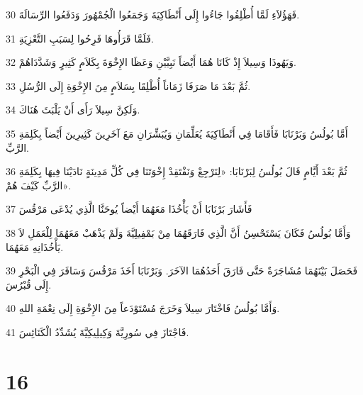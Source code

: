 \par 30 فَهَؤُلاَءِ لَمَّا أُطْلِقُوا جَاءُوا إِلَى أَنْطَاكِيَةَ وَجَمَعُوا الْجُمْهُورَ وَدَفَعُوا الرِّسَالَةَ.
\par 31 فَلَمَّا قَرَأُوهَا فَرِحُوا لِسَبَبِ التَّعْزِيَةِ.
\par 32 وَيَهُوذَا وَسِيلاَ إِذْ كَانَا هُمَا أَيْضاً نَبِيَّيْنِ وَعَظَا الإِخْوَةَ بِكَلاَمٍ كَثِيرٍ وَشَدَّدَاهُمْ.
\par 33 ثُمَّ بَعْدَ مَا صَرَفَا زَمَاناً أُطْلِقَا بِسَلاَمٍ مِنَ الإِخْوَةِ إِلَى الرُّسُلِ.
\par 34 وَلَكِنَّ سِيلاَ رَأَى أَنْ يَلْبَثَ هُنَاكَ.
\par 35 أَمَّا بُولُسُ وَبَرْنَابَا فَأَقَامَا فِي أَنْطَاكِيَةَ يُعَلِّمَانِ وَيُبَشِّرَانِ مَعَ آخَرِينَ كَثِيرِينَ أَيْضاً بِكَلِمَةِ الرَّبِّ.
\par 36 ثُمَّ بَعْدَ أَيَّامٍ قَالَ بُولُسُ لِبَرْنَابَا: «لِنَرْجِعْ وَنَفْتَقِدْ إِخْوَتَنَا فِي كُلِّ مَدِينَةٍ نَادَيْنَا فِيهَا بِكَلِمَةِ الرَّبِّ كَيْفَ هُمْ».
\par 37 فَأَشَارَ بَرْنَابَا أَنْ يَأْخُذَا مَعَهُمَا أَيْضاً يُوحَنَّا الَّذِي يُدْعَى مَرْقُسَ
\par 38 وَأَمَّا بُولُسُ فَكَانَ يَسْتَحْسِنُ أَنَّ الَّذِي فَارَقَهُمَا مِنْ بَمْفِيلِيَّةَ وَلَمْ يَذْهَبْ مَعَهُمَا لِلْعَمَلِ لاَ يَأْخُذَانِهِ مَعَهُمَا.
\par 39 فَحَصَلَ بَيْنَهُمَا مُشَاجَرَةٌ حَتَّى فَارَقَ أَحَدُهُمَا الآخَرَ. وَبَرْنَابَا أَخَذَ مَرْقُسَ وَسَافَرَ فِي الْبَحْرِ إِلَى قُبْرُسَ.
\par 40 وَأَمَّا بُولُسُ فَاخْتَارَ سِيلاَ وَخَرَجَ مُسْتَوْدَعاً مِنَ الإِخْوَةِ إِلَى نِعْمَةِ اللهِ.
\par 41 فَاجْتَازَ فِي سُورِيَّةَ وَكِيلِيكِيَّةَ يُشَدِّدُ الْكَنَائِسَ.

\chapter{16}


